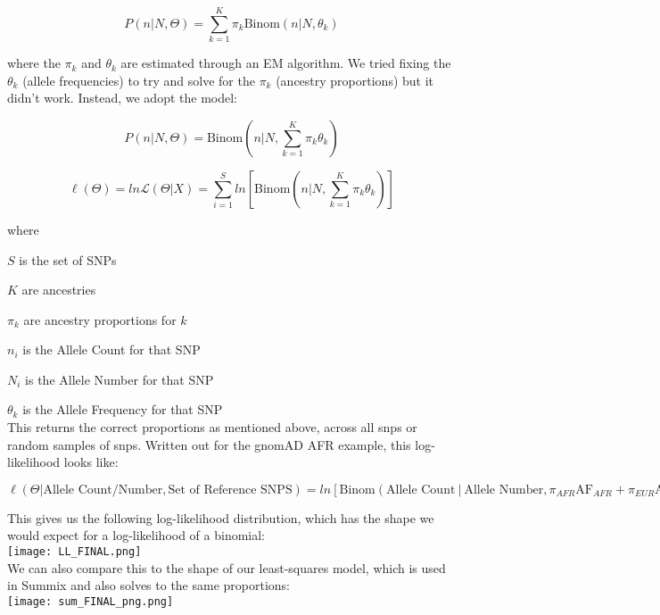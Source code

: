 \documentclass[11pt,a4paper]{article}
\begin{document}
$$ P \left( n \vert N, \Theta \right) = \sum_{k=1}^{K} \pi_k \mbox{Binom} \left( n \vert N, \theta_k \right) $$

where the $\pi_k$ and $\theta_k$ are estimated through an EM algorithm. We tried fixing the $\theta_k$ (allele frequencies) to try and solve for the $\pi_k$ (ancestry proportions) but it didn't work. Instead, we adopt the model:

$$ P \left( n \vert N, \Theta \right) = \mbox{Binom} \left( n \bigg\vert N, \sum_{k=1}^{K} \pi_k \theta_k \right) $$

$$ \ell( \Theta ) = ln \mathcal{L} (\Theta \vert X) = \sum_{i=1}^S ln \left[ \mbox{Binom} \left( n \bigg\vert N, \sum_{k=1}^{K} \pi_k \theta_k \right) \right] $$ 

where 

$S$ is the set of SNPs

$K$ are ancestries

$\pi_k$ are ancestry proportions for $k$

$n_i$ is the Allele Count for that SNP

$N_i$ is the Allele Number for that SNP

$\theta_k$ is the Allele Frequency for that SNP\\

This returns the correct proportions as mentioned above, across all snps or random samples of snps. Written out for the gnomAD AFR example, this log-likelihood looks like:

$$ \ell \left( \Theta \vert \mbox{Allele Count/Number},\mbox{Set of Reference SNPS} \right) = ln \left[ \mbox{Binom} \left( \mbox{Allele Count}\ \vert\ \mbox{Allele Number}, \pi_{AFR} \mbox{AF}_{AFR} + \pi_{EUR} \mbox{AF}_{EUR} \right) \right] $$

This gives us the following log-likelihood distribution, which has the shape we would expect for a log-likelihood of a binomial:\\

\texttt{[image: LL\_FINAL.png]} \\

We can also compare this to the shape of our least-squares model, which is used in Summix and also solves to the same proportions:\\

\texttt{[image: sum\_FINAL\_png.png]} \\
\end{document}
